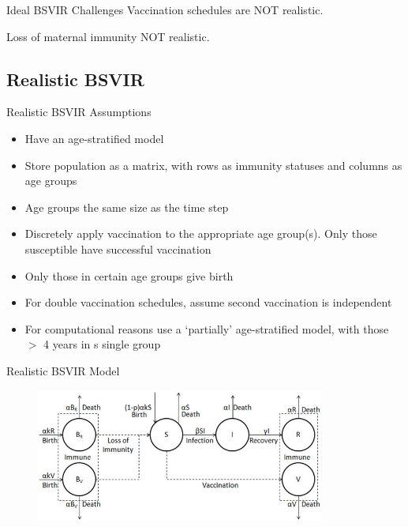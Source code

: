\documentclass{beamer}
\begin{document}
\begin{frame} {Ideal BSVIR} {Challenges}
Vaccination schedules are NOT realistic.

Loss of maternal immunity NOT realistic.
\end{frame}

\subsection{Realistic BSVIR}
\begin{frame} {Realistic BSVIR} {Assumptions}
\begin{itemize}
\item {Have an age-stratified model}
\item{Store population as a matrix, with rows as immunity statuses and columns as age groups}
\item{Age groups the same size as the time step}
\item{Discretely apply vaccination to the appropriate age group(s). Only those susceptible have successful vaccination}
\item{Only those in certain age groups give birth}
\item{For double vaccination schedules, assume second vaccination is independent}                        
\item{For computational reasons use a `partially' age-stratified model, with those $>$ 4 years in s single group}
\end{itemize}
\end{frame}

\begin{frame} {Realistic BSVIR} {Model}
\begin{figure}
\centering
\includegraphics[width=95mm]{realisticBSVIRmodel.jpg}
\end{figure}
\end{frame}
\end{document}
